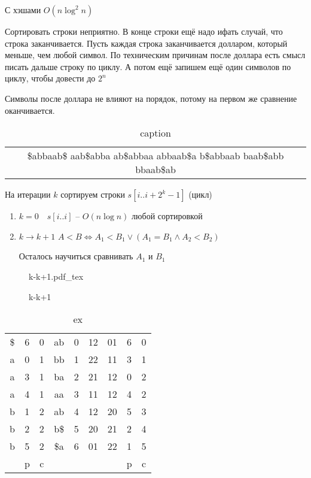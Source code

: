 \documentclass{book}
\theoremstyle{definition}
\newcommand{\incfig}[1]{%
    \def\svgwidth{\columnwidth}
    {#1.pdf_tex}
}
\begin{document}
С хэшами $O\left( n\log ^2n \right) $ 

Сортировать строки неприятно. В конце строки ещё надо ифать случай, что строка заканчивается. Пусть каждая строка заканчивается долларом, который меньше, чем любой символ. По техническим причинам после доллара есть смысл писать дальше строку по циклу. А потом ещё запишем ещё один символов по циклу, чтобы довести до $2^n$

Символы после доллара не влияют на порядок, потому на первом же сравнение оканчивается.

\begin{table}[htpb]
    \centering
    \caption{caption}
    \label{tab:label}
    \begin{tabular}{c}
    \$abbaab\$
    aab\$abba
    ab\$abbaa
    abbaab\$a
    b\$abbaab
    baab\$abb
    bbaab\$ab
    \end{tabular}
\end{table}         

На итерации $k$ сортируем строки  $s[i .. i + 2^k - 1]$ (цикл)
\begin{enumerate}
    \item $k = 0\quad s[i..i]$ -- $O\left( n\log n \right) $ любой сортировкой
    \item $k\to k+1$ $A<B \iff A_1 < B_1 \lor \left( A_1 = B_1 \land A_2 < B_2 \right) $ 

        Осталось научиться сравнивать $A_1$ и $B_1$
\end{enumerate}

\begin{figure}[!ht]
    \centering
    \incfig{k-k+1}
    \caption{k-k+1}
    \label{fig:k-k+1}
\end{figure}

\begin{table}[htpb]
    \centering
    \caption{ex}
    \label{tab:ex}
    \begin{tabular}{ccccccccc}
        \$ & 6 & 0 & ab & 0 & 12 & 01 & 6 & 0\\
        a & 0 & 1 & bb & 1 & 22 & 11 & 3 & 1\\
        a & 3 & 1 & ba & 2 & 21 & 12 & 0 & 2\\
        a & 4 & 1 & aa & 3 & 11 & 12 & 4 & 2\\
        b & 1 & 2 & ab & 4 & 12 & 20 & 5 & 3\\
        b & 2 & 2 & b\$ & 5 & 20 & 21 & 2 & 4\\
        b & 5 & 2 & \$a & 6 & 01 & 22 & 1 & 5\\
          & p & c &    &   &    &    & p & c\\
    \end{tabular}
\end{table}
\end{document}
